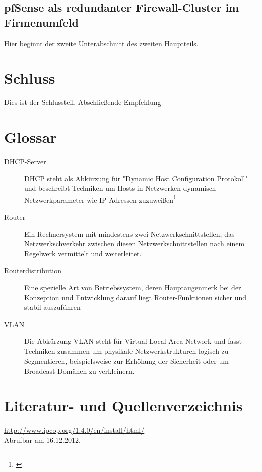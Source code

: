 \documentclass[a4paper,12pt]{scrartcl}
\begin{document}
\subsection{pfSense als redundanter Firewall-Cluster im Firmenumfeld}
Hier beginnt der zweite Unterabschnitt des zweiten Hauptteils.


\section{Schluss}
Dies ist der Schlussteil. Abschlie\ss{}ende Empfehlung
\clearpage

\section{Glossar}
\begin{description}
 \item[DHCP-Server] DHCP steht als Abk\"urzung f\"ur "Dynamic Host
Configuration Protokoll" und beschreibt Techniken um Hosts in Netzwerken
dynamisch Netzwerkparameter wie IP-Adressen zuzuwei\ss{}en\footnote{\cite{dhcp}}
 \item[Router] Ein Rechnersystem mit mindestens zwei Netzwerkschnittstellen,
das Netzwerkschverkehr zwischen diesen Netzwerkschnittstellen nach einem
Regelwerk vermittelt und weiterleitet.
 \item[Routerdistribution] Eine spezielle Art von Betriebssystem, deren
Hauptaugenmerk bei der Konzeption und Entwicklung darauf liegt
Router-Funktionen sicher und stabil auszuf\"uhren
 \item[VLAN] Die Abk\"urzung VLAN steht f\"ur Virtual Local Area Network und
fasst Techniken zusammen um physikale Netzwerkstrukturen logisch zu
Segmentieren, beispielsweise zur Erh\"ohung der Sicherheit oder um
Broadcast-Dom\"anen zu verkleinern.
\end{description}
\clearpage

\section{Literatur- und Quellenverzeichnis}

\renewcommand\refname{Literaturverzeichnis}
\begin{thebibliography}{999}
\url{http://www.ipcop.org/1.4.0/en/install/html/}
\\Abrufbar am 16.12.2012.
\end{thebibliography}
\end{document}
